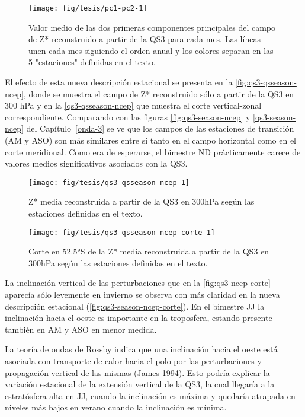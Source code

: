 \documentclass[spanish,a4paper,12p]{book}
\begin{document}
\begin{figure*}
\texttt{[image: fig/tesis/pc1-pc2-1]} \caption{Valor medio de las dos primeras componentes principales del campo de Z* reconstruido a partir de la QS3 para cada mes. Las líneas unen cada mes siguiendo el orden anual y los colores separan en las 5 "estaciones" definidas en el texto.}\label{fig:pc1-pc2}
\end{figure*}

El efecto de esta nueva descripción estacional se presenta en la
\autoref{fig:qs3-qsseason-ncep}, donde se muestra el campo de Z*
reconstruido sólo a partir de la QS3 en 300 hPa y en la
\autoref{qs3-qsseason-ncep} que muestra el corte vertical-zonal
correspondiente. Comparando con las figuras \ref{fig:qs3-season-ncep} y
\ref{qs3-season-ncep} del Capítulo~\ref{onda-3} se ve que los campos de
las estaciones de transición (AM y ASO) son más similares entre sí tanto
en el campo horizontal como en el corte meridional. Como era de
esperarse, el bimestre ND prácticamente carece de valores medios
significativos asociados con la QS3.

\begin{figure*}
\texttt{[image: fig/tesis/qs3-qsseason-ncep-1]} \caption{Z* media reconstruida a partir de la QS3 en 300hPa según las estaciones definidas en el texto.}\label{fig:qs3-qsseason-ncep}
\end{figure*}

\begin{figure*}
\texttt{[image: fig/tesis/qs3-qsseason-ncep-corte-1]} \caption{Corte en 52.5°S de la Z* media reconstruida a partir de la QS3 en 300hPa según las estaciones definidas en el texto.}\label{fig:qs3-qsseason-ncep-corte}
\end{figure*}

La inclinación vertical de las perturbaciones que en la
\autoref{fig:qs3-ncep-corte} aparecía sólo levemente en invierno se
observa con más claridad en la nueva descripción estacional
(\autoref{fig:qs3-season-ncep-corte}). En el bimestre JJ la inclinación
hacia el oeste es importante en la troposfera, estando presente también
en AM y ASO en menor medida.

La teoría de ondas de Rossby indica que una inclinación hacia el oeste
está asociada con transporte de calor hacia el polo por las
perturbaciones y propagación vertical de las mismas (James
\protect\hyperlink{ref-James}{1994}). Esto podría explicar la variación
estacional de la extensión vertical de la QS3, la cual llegaría a la
estratósfera alta en JJ, cuando la inclinación es máxima y quedaría
atrapada en niveles más bajos en verano cuando la inclinación es mínima.
\end{document}
